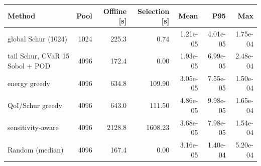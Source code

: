 \begin{tabular}{lrrrrrr}
\toprule
Method & Pool & Offline [s] & Selection [s] & Mean & P95 & Max \\
\midrule
global Schur (1024) & 1024 & 225.3 & 0.74 & 1.21e-05 & 4.01e-05 & 1.75e-04 \\
tail Schur, CVaR 15%
Sobol + POD & 4096 & 172.4 & 0.00 & 1.93e-05 & 6.99e-05 & 2.48e-04 \\
energy greedy & 4096 & 634.8 & 109.90 & 3.05e-05 & 7.55e-05 & 1.50e-04 \\
QoI/Schur greedy & 4096 & 643.0 & 111.50 & 4.86e-05 & 9.98e-05 & 1.65e-04 \\
sensitivity-aware & 4096 & 2128.8 & 1608.23 & 3.68e-05 & 7.98e-05 & 1.54e-04 \\
Random (median) & 4096 & 167.4 & 0.00 & 3.16e-05 & 1.40e-04 & 5.20e-04 \\
\bottomrule
\end{tabular}

